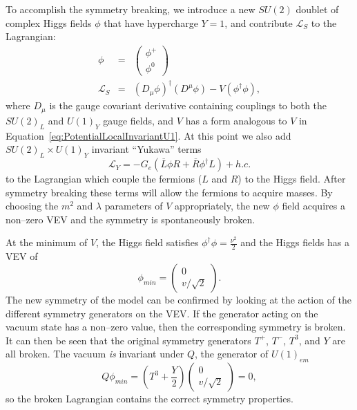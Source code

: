 To accomplish the symmetry breaking, we introduce a new $SU(2)$ doublet of
complex Higgs fields $\phi$ that have hypercharge $Y = 1$, and contribute
$\mathcal{L}_S$ to the Lagrangian:
\begin{eqnarray}
  \phi &=& \left(\begin{array}{c}\phi^+ \\ \phi^0\end{array}\right) \\
  \mathcal{L}_S &=& (D_\mu \phi)^\dag(D^\mu \phi) - V(\phi^\dag\phi),
\end{eqnarray}
where $D_\mu$ is the gauge covariant derivative containing couplings to both the
$SU(2)_L$ and $U(1)_Y$ gauge fields, and $V$ has a form analogous to $V$ in
Equation~\ref{eq:PotentialLocalInvariantU1}.  At this point we also add $SU(2)_L
\times U(1)_Y$ invariant ``Yukawa'' terms 
\begin{equation}
  \mathcal{L}_Y = -G_e(\overline L \phi R + \overline R \phi^\dag L) + h.c.
  \label{eq:YukawaTerms}
\end{equation}
to the Lagrangian which couple the fermions ($L$ and $R$) to the Higgs field.
After symmetry breaking these terms will allow the fermions to acquire masses.
By choosing the $m^2$ and $\lambda$ parameters of $V$ appropriately, the new
$\phi$ field acquires a non--zero VEV and the symmetry is spontaneously broken.

At the minimum of $V$, the Higgs field satisfies $\phi^\dag\phi =
\frac{\nu^2}{2}$ and the Higgs fields has a VEV of
\begin{equation}
  \phi_{min} = \left(\begin{array}{c} 0 \\ v/\sqrt{2} \end{array}\right).
\end{equation}
The new symmetry of the model can be confirmed by looking at the action of the
different symmetry generators on the VEV\@.  If the generator acting on the
vacuum state has a non--zero value, then the corresponding symmetry is broken.
It can then be seen that the original symmetry generators $T^+$, $T^-$, $T^3$,
and $Y$ are all broken.  The vacuum \emph{is} invariant under $Q$, the generator
of $U(1)_{em}$
\begin{equation}
  Q\phi_{min} = (T^3 + \frac{Y}{2})\left(\begin{array}{c} 0 \\ v/\sqrt{2}
  \end{array}\right) = 0 \nonumber,
\end{equation}
so the broken Lagrangian contains the correct symmetry properties.

